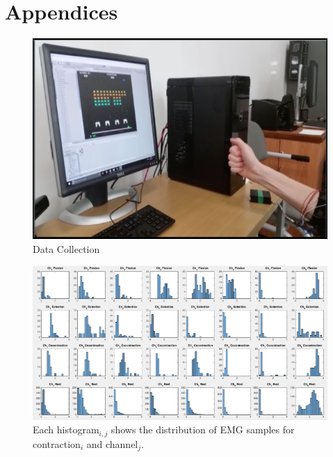 \documentclass[times, 10pt,twocolumn]{article}
\begin{document}
\section{Appendices}
\begin{figure}
  \includegraphics[width=\linewidth]{Figures/f1.png}
  \caption{Data Collection}
  \label{fig:data_collection}
\end{figure}

\begin{figure}
  \includegraphics[width=\linewidth]{Figures/f2.png}
  \caption{Each histogram$_{i,j}$ shows the distribution of EMG samples for contraction$_i$ and channel$_j$.}
  \label{fig:histogram}
\end{figure}
\end{document}
